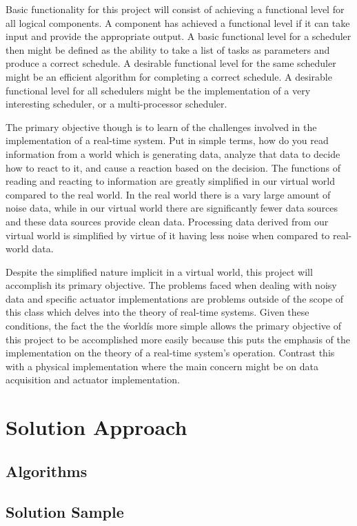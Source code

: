\documentclass{article} %
\begin{document}
Basic functionality for this project will consist of achieving a functional level for all logical components.
A component has achieved a functional level if it can take input and provide the appropriate output.
A basic functional level for a scheduler then might be defined as the ability to take a list of tasks as parameters and produce a correct schedule.
A desirable functional level for the same scheduler might be an efficient algorithm for completing a correct schedule.
A desirable functional level for all schedulers might be the implementation of a very interesting scheduler, or a multi-processor scheduler.

The primary objective though is to learn of the challenges involved in the implementation of a real-time system.
Put in simple terms, how do you read information from a world which is generating data, analyze that data to decide how to react to it, and cause a reaction based on the decision.
The functions of reading and reacting to information are greatly simplified in our virtual world compared to the real world.
In the real world there is a vary large amount of noise data, while in our virtual world there are significantly fewer data sources and these data sources provide clean data.
Processing data derived from our virtual world is simplified by virtue of it having less noise when compared to real-world data.

Despite the simplified nature implicit in a virtual world, this project will accomplish its primary objective.
The problems faced when dealing with noisy data and specific actuator implementations are problems outside of the scope of this class which delves into the theory of real-time systems.
Given these conditions, the fact the the \'world\' is more simple allows the primary objective of this project to be accomplished more easily because this puts the emphasis of the implementation on the theory of a real-time system's operation.
Contrast this with a physical implementation where the main concern might be on data acquisition and actuator implementation.

\section{Solution Approach}
\subsection{Algorithms}

\subsection{Solution Sample}
\end{document}
